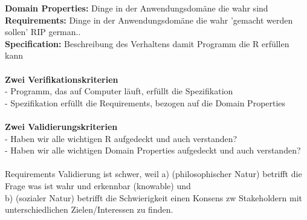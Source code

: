 \textbf{Domain Properties:} Dinge in der Anwendungsdomäne die wahr sind\\
\textbf{Requirements:} Dinge in der Anwendungsdomäne die wahr 'gemacht werden sollen' {\tiny RIP german..}\\
\textbf{Specification:} Beschreibung des Verhaltens damit Programm die R erfüllen kann\\
\\
\textbf{Zwei Verifikationskriterien}\\
- Programm, das auf Computer läuft, erfüllt die Spezifikation\\
- Spezifikation erfüllt die Requirements, bezogen auf die Domain Properties\\
\\
\textbf{Zwei Validierungskriterien}\\
- Haben wir alle wichtigen R aufgedeckt und auch verstanden?\\
- Haben wir alle wichtigen Domain Properties aufgedeckt und auch verstanden?\\
\\
Requirements Validierung ist schwer, weil a) (philosophischer Natur) betrifft die Frage was ist wahr und erkennbar (knowable) und \\
b) (sozialer Natur) betrifft die Schwierigkeit einen Konsens zw Stakeholdern mit unterschiedlichen Zielen/Interessen zu finden.


